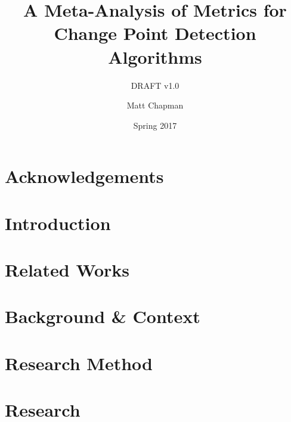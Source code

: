 \documentclass{uvamscse}	%
\title{A Meta-Analysis of Metrics for Change Point Detection Algorithms}
\subtitle{DRAFT v1.0}
\date{Spring 2017}
\author{Matt Chapman}
\begin{document}
\maketitle


\chapter*{Acknowledgements}




\chapter{Introduction}




\chapter{Related Works}




\chapter{Background \& Context}
\label{background}




\chapter{Research Method}
\label{Research Method}




\chapter{Research}
\end{document}
